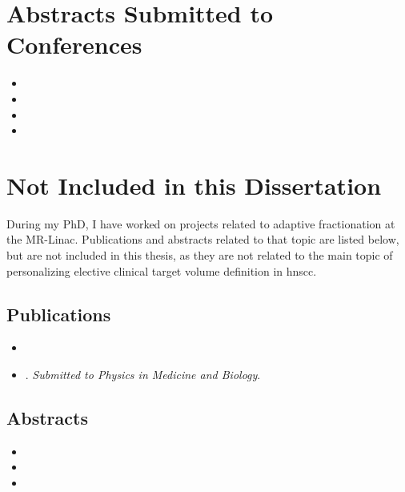 \documentclass[\relativeRoot/main.tex]{subfiles}
\begin{document}
\section*{Abstracts Submitted to Conferences}
\begin{itemize}
    \item {}
    \item {}
    \item {}
    \item {}
\end{itemize}

\section*{Not Included in this Dissertation}

During my PhD, I have worked on projects related to adaptive fractionation at the MR-Linac. Publications and abstracts related to that topic are listed below, but are not included in this thesis, as they are not related to the main topic of personalizing elective clinical target volume definition in \gls{hnscc}.

\subsection*{Publications}
\begin{itemize}
    \item {}
    \item {}. \emph{Submitted to Physics in Medicine and Biology}.
\end{itemize}

\subsection*{Abstracts}
\begin{itemize}
    \item {}
    \item {}
    \item {}
\end{itemize}

\tableofcontents
\thispagestyle{plain}
\end{document}
